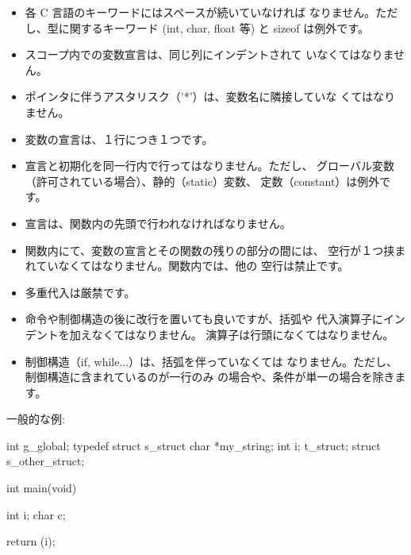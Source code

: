 \documentclass{42-ja}
\begin{document}
\begin{itemize}
                \item 各 C 言語のキーワードにはスペースが続いていなければ
					なりません。ただし、型に関するキーワード (int, char,
					float 等) と sizeof は例外です。

                \item スコープ内での変数宣言は、同じ列にインデントされて
					いなくてはなりません。

                \item ポインタに伴うアスタリスク（'*'）は、変数名に隣接していな
					くてはなりません。

                \item 変数の宣言は、１行につき１つです。

                \item 宣言と初期化を同一行内で行ってはなりません。ただし、
					グローバル変数（許可されている場合）、静的（static）変数、
					定数（constant）は例外です。

                \item 宣言は、関数内の先頭で行われなければなりません。

                \item 関数内にて、変数の宣言とその関数の残りの部分の間には、
					空行が１つ挟まれていなくてはなりません。関数内では、他の
					空行は禁止です。

                \item 多重代入は厳禁です。

                \item 命令や制御構造の後に改行を置いても良いですが、括弧や
					代入演算子にインデントを加えなくてはなりません。
					演算子は行頭になくてはなりません。

                \item 制御構造（if, while...）は、括弧を伴っていなくては
					なりません。ただし、制御構造に含まれているのが一行のみ
					の場合や、条件が単一の場合を除きます。

            \end{itemize}

            一般的な例:
            \begin{42ccode}
int             g_global;
typedef struct  s_struct
{
    char    *my_string;
    int     i;
}               t_struct;
struct          s_other_struct;

int     main(void)
{
    int     i;
    char    c;

    return (i);
}
            \end{42ccode}
            \newpage
\end{document}
